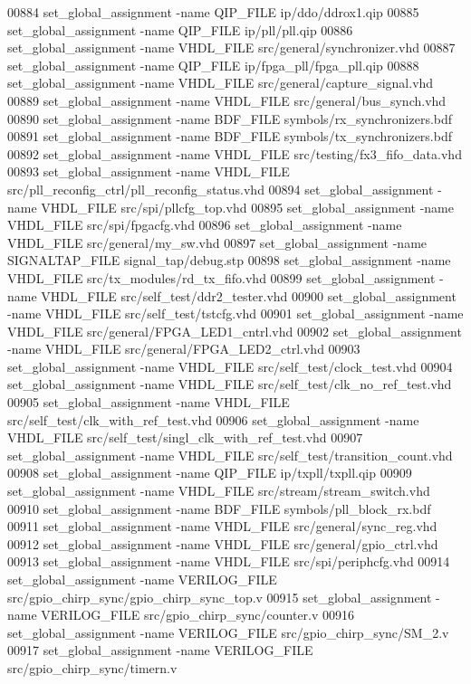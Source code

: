 \begin{DoxyCode}
00884 set\_global\_assignment -name QIP\_FILE ip/ddo/ddrox1.qip
00885 set\_global\_assignment -name QIP\_FILE ip/pll/pll.qip
00886 set\_global\_assignment -name VHDL\_FILE src/general/synchronizer.vhd
00887 set\_global\_assignment -name QIP\_FILE ip/fpga\_pll/fpga\_pll.qip
00888 set\_global\_assignment -name VHDL\_FILE src/general/capture\_signal.vhd
00889 set\_global\_assignment -name VHDL\_FILE src/general/bus\_synch.vhd
00890 set\_global\_assignment -name BDF\_FILE symbols/rx\_synchronizers.bdf
00891 set\_global\_assignment -name BDF\_FILE symbols/tx\_synchronizers.bdf
00892 set\_global\_assignment -name VHDL\_FILE src/testing/fx3\_fifo\_data.vhd
00893 set\_global\_assignment -name VHDL\_FILE src/pll\_reconfig\_ctrl/pll\_reconfig\_status.vhd
00894 set\_global\_assignment -name VHDL\_FILE src/spi/pllcfg\_top.vhd
00895 set\_global\_assignment -name VHDL\_FILE src/spi/fpgacfg.vhd
00896 set\_global\_assignment -name VHDL\_FILE src/general/my\_sw.vhd
00897 set\_global\_assignment -name SIGNALTAP\_FILE signal\_tap/debug.stp
00898 set\_global\_assignment -name VHDL\_FILE src/tx\_modules/rd\_tx\_fifo.vhd
00899 set\_global\_assignment -name VHDL\_FILE src/self\_test/ddr2\_tester.vhd
00900 set\_global\_assignment -name VHDL\_FILE src/self\_test/tstcfg.vhd
00901 set\_global\_assignment -name VHDL\_FILE src/general/FPGA\_LED1\_cntrl.vhd
00902 set\_global\_assignment -name VHDL\_FILE src/general/FPGA\_LED2\_ctrl.vhd
00903 set\_global\_assignment -name VHDL\_FILE src/self\_test/clock\_test.vhd
00904 set\_global\_assignment -name VHDL\_FILE src/self\_test/clk\_no\_ref\_test.vhd
00905 set\_global\_assignment -name VHDL\_FILE src/self\_test/clk\_with\_ref\_test.vhd
00906 set\_global\_assignment -name VHDL\_FILE src/self\_test/singl\_clk\_with\_ref\_test.vhd
00907 set\_global\_assignment -name VHDL\_FILE src/self\_test/transition\_count.vhd
00908 set\_global\_assignment -name QIP\_FILE ip/txpll/txpll.qip
00909 set\_global\_assignment -name VHDL\_FILE src/stream/stream\_switch.vhd
00910 set\_global\_assignment -name BDF\_FILE symbols/pll\_block\_rx.bdf
00911 set\_global\_assignment -name VHDL\_FILE src/general/sync\_reg.vhd
00912 set\_global\_assignment -name VHDL\_FILE src/general/gpio\_ctrl.vhd
00913 set\_global\_assignment -name VHDL\_FILE src/spi/periphcfg.vhd
00914 set\_global\_assignment -name VERILOG\_FILE src/gpio\_chirp\_sync/gpio\_chirp\_sync\_top.v
00915 set\_global\_assignment -name VERILOG\_FILE src/gpio\_chirp\_sync/counter.v
00916 set\_global\_assignment -name VERILOG\_FILE src/gpio\_chirp\_sync/SM\_2.v
00917 set\_global\_assignment -name VERILOG\_FILE src/gpio\_chirp\_sync/timern.v

\end{DoxyCode}
